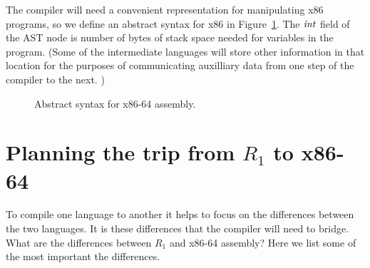 \documentclass[11pt]{book}
\begin{document}
The compiler will need a convenient representation for manipulating
x86 programs, so we define an abstract syntax for x86 in
Figure~\ref{fig:x86-ast-a}. The $\mathit{int}$ field of the  AST
node is number of bytes of stack space needed for variables in the
program. (Some of the intermediate languages will store other
information in that location for the purposes of communicating
auxilliary data from one step of the compiler to the next. )

\begin{figure}[tbp]
\caption{Abstract syntax for x86-64 assembly.}
\label{fig:x86-ast-a}
\end{figure}

\section{Planning the trip from $R_1$ to x86-64}
\label{sec:plan-s0-x86}

To compile one language to another it helps to focus on the
differences between the two languages. It is these differences that
the compiler will need to bridge. What are the differences between
$R_1$ and x86-64 assembly? Here we list some of the most important the
differences.
\end{document}
